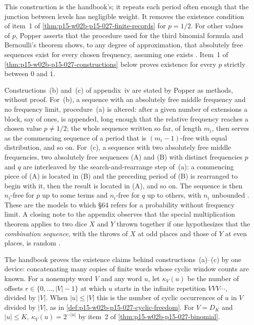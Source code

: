 This construction is the handbook's; it repeats each period often enough
that the junction between levels has negligible weight. It removes the
existence condition of item~1 of \cref{thm:p15-w02b-p15-027-finite-records}
for \(p=1/2\). For other values of \(p\), Popper asserts that the procedure
used for the third binomial formula and Bernoulli's theorem shows, to any
degree of approximation, that absolutely free sequences exist for every
chosen frequency, assuming one exists
\parencite[appendix~iv, p.~295]{Popper2002LogicDiscoveryUI}. Item~1
of \cref{thm:p15-w02b-p15-027-constructions} below proves existence for
every \(p\) strictly between \(0\) and \(1\).

Constructions~(b) and~(c) of appendix~iv are stated by Popper as
methods, without proof. For~(b), a sequence with an absolutely free middle
frequency and no frequency limit, procedure~(a) is altered: after a given
number of extensions a block, say of ones, is appended, long enough that
the relative frequency reaches a chosen value \(p\neq1/2\); the whole
sequence written so far, of length \(m_i\), then serves as the commencing
sequence of a period that is \((m_i-1)\)-free with equal distribution, and
so on. For~(c), a sequence with two absolutely free middle frequencies,
two absolutely free sequences (A) and (B) with distinct frequencies \(p\)
and \(q\) are interleaved by the search-and-rearrange step of~(a):
a commencing piece of (A) is located in (B) and the preceding period of (B)
is rearranged to begin with it, then the result is located in (A), and
so on. The sequence is then \(n_i\)-free for \(p\) up to some terms and
\(n_i\)-free for \(q\) up to others, with \(n_i\) unbounded
\parencite[appendix~iv, p.~296]{Popper2002LogicDiscoveryUI}. These are
the models to which \S64 refers for a probability without frequency limit.
A closing note to the appendix observes that the special multiplication
theorem applies to two dice \(X\) and \(Y\) thrown together if one
hypothesizes that the \emph{combination sequence}, with the throws of
\(X\) at odd places and those of \(Y\) at even places, is random
\parencite[appendix~iv, note, p.~296]{Popper2002LogicDiscoveryUI}.

The handbook proves the existence claims behind constructions~(a)--(c)
by one device: concatenating many copies of finite words whose cyclic
window counts are known. For a nonempty word \(V\) and any word \(u\),
let \(\kappa_V(u)\) be the number of offsets \(r\in\{0,\ldots,|V|-1\}\) at
which \(u\) starts in the infinite repetition \(VVV\cdots\), divided by
\(|V|\). When \(|u|\leq|V|\) this is the number of cyclic occurrences of
\(u\) in \(V\) divided by \(|V|\), as in
\cref{def:p15-w02b-p15-027-cyclic-freedom}. For \(V=D_K\) and
\(|u|\leq K\), \(\kappa_V(u)=2^{-|u|}\) by item~2 of
\cref{thm:p15-w02b-p15-027-binomial}.

